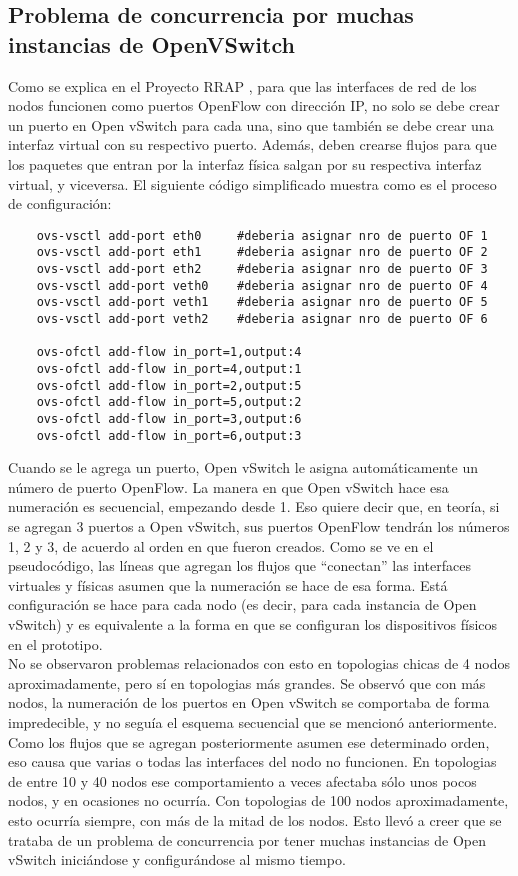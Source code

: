 \subsection{Problema de concurrencia por muchas instancias de OpenVSwitch}
Como se explica en el Proyecto RRAP \cite{proyecto-rrap}, para que las interfaces de red de los nodos funcionen como puertos OpenFlow con dirección IP, no solo se debe crear un puerto en Open vSwitch para cada una, sino que también se debe crear una interfaz virtual con su respectivo puerto. Además, deben crearse flujos para que los paquetes que entran por la interfaz física salgan por su respectiva interfaz virtual, y viceversa.
El siguiente código simplificado muestra como es el proceso de configuración:
\begin{lstlisting}
	ovs-vsctl add-port eth0		#deberia asignar nro de puerto OF 1
	ovs-vsctl add-port eth1		#deberia asignar nro de puerto OF 2
	ovs-vsctl add-port eth2		#deberia asignar nro de puerto OF 3
	ovs-vsctl add-port veth0	#deberia asignar nro de puerto OF 4
	ovs-vsctl add-port veth1	#deberia asignar nro de puerto OF 5
	ovs-vsctl add-port veth2	#deberia asignar nro de puerto OF 6
	
	ovs-ofctl add-flow in_port=1,output:4
	ovs-ofctl add-flow in_port=4,output:1
	ovs-ofctl add-flow in_port=2,output:5
	ovs-ofctl add-flow in_port=5,output:2
	ovs-ofctl add-flow in_port=3,output:6
	ovs-ofctl add-flow in_port=6,output:3
\end{lstlisting}
Cuando se le agrega un puerto, Open vSwitch le asigna automáticamente un número de puerto OpenFlow. La manera en que Open vSwitch hace esa numeración es secuencial, empezando desde 1. Eso quiere decir que, en teoría, si se agregan 3 puertos a Open vSwitch, sus puertos OpenFlow tendrán los números 1, 2 y 3, de acuerdo al orden en que fueron creados. Como se ve en el pseudocódigo, las líneas que agregan los flujos que \enquote{conectan} las interfaces virtuales y físicas asumen que la numeración se hace de esa forma. Está configuración se hace para cada nodo (es decir, para cada instancia de Open vSwitch) y es equivalente a la forma en que se configuran los dispositivos físicos en el prototipo. \\
No se observaron problemas relacionados con esto en topologias chicas de 4 nodos aproximadamente, pero sí en topologias más grandes. Se observó que con más nodos, la numeración de los puertos en Open vSwitch se comportaba de forma impredecible, y no seguía el esquema secuencial que se mencionó anteriormente. Como los flujos que se agregan posteriormente asumen ese determinado orden, eso causa que varias o todas las interfaces del nodo no funcionen. En topologias de entre 10 y 40 nodos ese comportamiento a veces afectaba sólo unos pocos nodos, y en ocasiones no ocurría. Con topologias de 100 nodos aproximadamente, esto ocurría siempre, con más de la mitad de los nodos. Esto llevó a creer que se trataba de un problema de concurrencia por tener muchas instancias de Open vSwitch iniciándose y configurándose al mismo tiempo. \\
